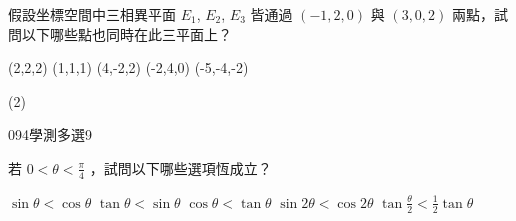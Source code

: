 \begin{QUESTIONS}
\begin{QUESTION}
\begin{QBODY}
			假設坐標空間中三相異平面 $E_1$, $E_2$, $E_3$ 皆通過 $(-1,2,0)$ 與 $(3,0,2)$ 兩點，試問以下哪些點也同時在此三平面上？ 
			\begin{QOPS} 
				\QOP (2,2,2) 
				\QOP (1,1,1) 
				\QOP (4,-2,2) 
				\QOP (-2,4,0) 
				\QOP (-5,-4,-2)
			\end{QOPS}
        \end{QBODY}
        \begin{QFROMS}
        \end{QFROMS}
        \begin{QTAGS}\end{QTAGS}
        \begin{QANS}
            (2)
        \end{QANS}
        \begin{QSOLLIST}
        \end{QSOLLIST}
        \begin{QEMPTYSPACE}
        \end{QEMPTYSPACE}
    \end{QUESTION}
    \begin{QUESTION}
        \begin{ExamInfo}{094}{學測}{多選}{9}
        \end{ExamInfo}
        \begin{ExamAnsRateInfo}{37}{69}{32}{10}
        \end{ExamAnsRateInfo}
        \begin{QBODY}
			若 $0 < \theta < \frac{\pi}{4}$ ，試問以下哪些選項恆成立？ 
			\begin{QOPS} 
				\QOP	$\sin \theta < \cos \theta$	
				\QOP	$\tan \theta < \sin \theta$ 
				\QOP $\cos \theta < \tan \theta$ 
				\QOP $\sin{2\theta} <\cos{2\theta}$ 
				\QOP $\tan{\frac{\theta}{2}} <\frac{1}{2} \tan \theta$
			\end{QOPS}
			

\end{QBODY}
\end{QUESTION}
\end{QUESTIONS}
